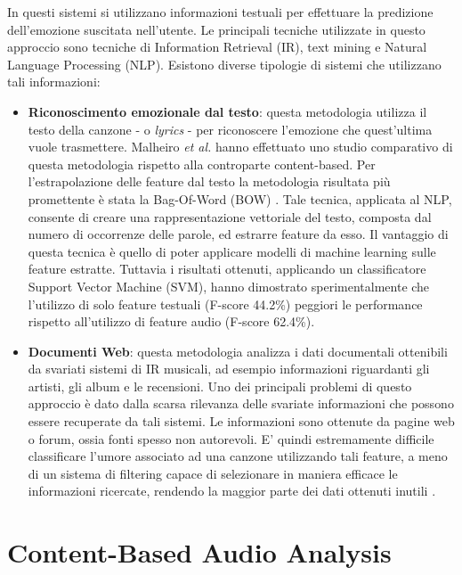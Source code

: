 \documentclass[11pt]{report}
\begin{document}
In questi sistemi si utilizzano informazioni testuali per effettuare la predizione dell'emozione suscitata nell'utente. Le principali tecniche utilizzate in questo approccio sono tecniche di Information Retrieval (IR), text mining e Natural Language Processing (NLP). Esistono diverse tipologie di sistemi che utilizzano tali informazioni:
\begin{itemize}
    \item \textbf{Riconoscimento emozionale dal testo}:
    questa metodologia utilizza il testo della canzone - o \textit{lyrics} - per riconoscere l'emozione che quest'ultima vuole trasmettere. Malheiro \textit{et al.} \cite{lyrics} hanno effettuato uno studio comparativo di questa metodologia rispetto alla controparte content-based. Per l'estrapolazione delle feature dal testo la metodologia risultata più promettente è stata la Bag-Of-Word (BOW) \cite{sebastiani2002machine}. Tale tecnica, applicata al NLP, consente di creare una rappresentazione vettoriale del testo, composta dal numero di occorrenze delle parole, ed estrarre feature da esso. Il vantaggio di questa tecnica è quello di poter applicare modelli di machine learning sulle feature estratte. Tuttavia i risultati ottenuti, applicando un classificatore Support Vector Machine (SVM), hanno dimostrato sperimentalmente che l'utilizzo di solo feature testuali (F-score 44.2\%) peggiori le performance rispetto all'utilizzo di feature audio (F-score 62.4\%).

    
    \item \textbf{Documenti Web}: questa metodologia analizza i dati documentali ottenibili da svariati sistemi di IR musicali, ad esempio informazioni riguardanti gli artisti, gli album e le recensioni. Uno dei principali problemi di questo approccio è dato dalla scarsa rilevanza delle svariate informazioni che possono essere recuperate da tali sistemi. Le informazioni sono ottenute da pagine web o forum, ossia fonti spesso non autorevoli. E' quindi estremamente difficile classificare l'umore associato ad una canzone utilizzando tali feature, a meno di un sistema di filtering capace di selezionare in maniera efficace le informazioni ricercate, rendendo la maggior parte dei dati ottenuti inutili \cite{levy2007semantic}.
    
    
\end{itemize}



\section{Content-Based Audio Analysis}
\end{document}
